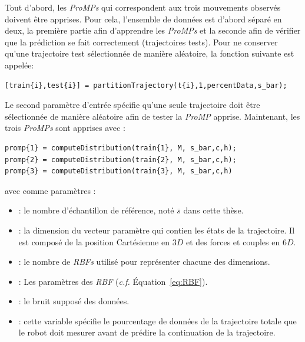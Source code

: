 \documentclass[utf8]{frontiersSCNS} %
\newcommand{\comment}[1]{}
\newcommand{\rev}[1]{\textcolor{blue}{#1}}
\begin{document}
Tout d'abord, les \textit{ProMPs} qui correspondent aux trois mouvements observés doivent être apprises. Pour cela, l'ensemble de données est d'abord séparé en deux, la première partie afin d'apprendre les \textit{ProMPs} et la seconde afin de vérifier que la prédiction se fait correctement (trajectoires tests). 
Pour ne conserver qu'une trajectoire test sélectionnée de manière aléatoire, la fonction suivante est appelée:
\begin{lstlisting}
[train{i},test{i}] = partitionTrajectory(t{i},1,percentData,s_bar);
\end{lstlisting}
Le second paramètre d'entrée spécifie qu'une seule trajectoire doit être sélectionnée de manière aléatoire afin de tester la \textit{ProMP} apprise. %
Maintenant, les trois \textit{ProMPs} sont apprises avec :

\begin{lstlisting}
promp{1} = computeDistribution(train{1}, M, s_bar,c,h);
promp{2} = computeDistribution(train{2}, M, s_bar,c,h);
promp{3} = computeDistribution(train{3}, M, s_bar,c,h)
\end{lstlisting}

avec comme paramètres :
\begin{itemize}
\item {} : le nombre d'échantillon de référence, noté $\bar{s}$ dans cette thèse.
\item {} : la dimension du vecteur paramètre qui contien les états de la trajectoire. Il est composé de la position Cartésienne en $3D$ et des forces et couples en $6D$.\comment{\footnote{Note that in our example wrenches are separated from the Cartesian position, because they are not used to recognize the index of the current ProMP during the inference.}}
\item {}: le nombre de \textit{RBFs} utilisé pour représenter chacune des  dimensions.
\item {}: Les paramètres des \textit{RBF} (\textit{c.f.} Équation~\ref{eq:RBF}).
\item {} : le bruit supposé des données.
\item {} : cette variable spécifie le pourcentage de données de la trajectoire totale que le robot doit mesurer avant de prédire la continuation de la trajectoire.
\end{itemize}
\end{document}

